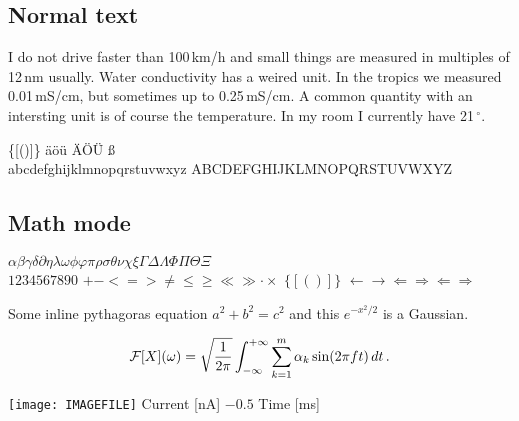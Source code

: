 \subsection{Normal text}

I do not drive faster than 100\,km/h and small things are measured in
multiples of 12\,nm usually. Water conductivity has a weired unit. In
the tropics we measured 0.01\,mS/cm, but sometimes up to
0.25\,mS/cm. A common quantity with an intersting unit is of course
the temperature. In my room I currently have 21\,$^{\circ}$.

\bigskip
{} \qquad \{[()]\} \qquad \"a\"o\"u  \"A\"O\"U {\ss} \\
abcdefghijklmnopqrstuvwxyz \qquad ABCDEFGHIJKLMNOPQRSTUVWXYZ

\subsection{Math mode}

$\alpha\beta\gamma\delta\partial\eta\lambda\omega\phi\varphi\pi\rho\sigma\theta\nu\chi\xi\Gamma\Delta\Lambda\Phi\Pi\Theta\Xi$\\
$1234567890$
\qquad $+ - <=> \ne \le \ge \ll \gg \cdot \times$
\qquad $\{[()]\}$
\qquad $\leftarrow \rightarrow \Leftarrow \Rightarrow \Longleftarrow \Longrightarrow$

\bigskip
\noindent
Some inline pythagoras equation $a^2 + b^2 = c^2$ and this $e^{-x^2/2}$ is a Gaussian.

\[ {\cal F}[X](\omega) = \sqrt{\frac{1}{2\pi}}\int_{-\infty}^{+\infty} \sum_{k=1}^m \alpha_k\sin(2\pi f t)\,dt\,. \]

\noindent
\texttt{[image: IMAGEFILE]}
Current [nA] \qquad $-0.5$   \qquad Time [ms]
